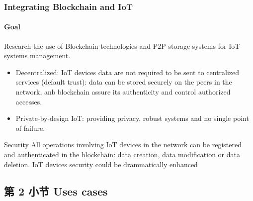 \documentclass[
    aspectratio=169,                   %
]{beamer}
\begin{document}
    \begin{frame}
        \frametitle{Integrating Blockchain and IoT}

        \paragraph{Goal} Research the use of \alert{Blockchain technologies} and \alert{P2P storage systems} for IoT systems management.

        \begin{itemize}
            \item \alert{Decentralized}: IoT devices data are not required to be sent to centralized services (default trust): data can be stored securely on the peers in the network, anb blockchain assure its authenticity and control authorized accesses.
            \item \alert{Private-by-design IoT}: providing privacy, robust systems and no single point of failure.
        \end{itemize}

        \begin{block}{Security}
            All operations involving IoT devices in the network can be registered and authenticated in the blockchain: data creation, data modification or data deletion. IoT devices security could be drammatically enhanced
        \end{block}

    \end{frame}

\subsection{第 2 小节 Uses cases}
\end{document}

